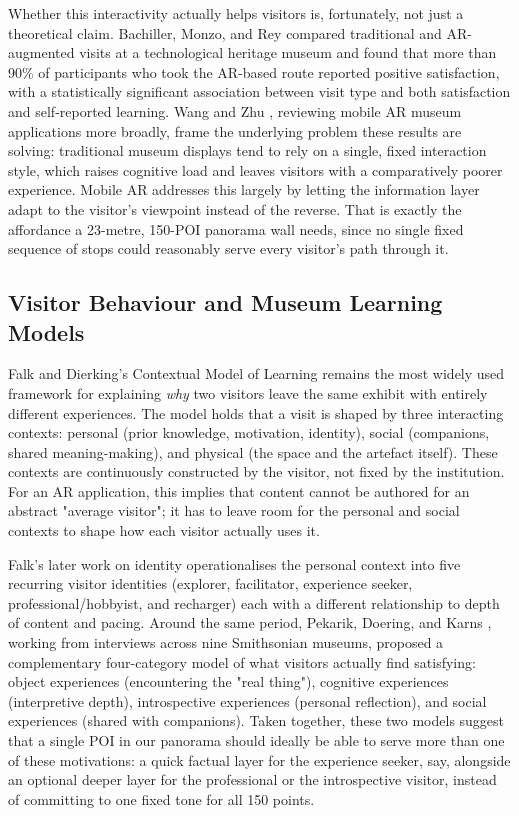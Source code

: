 Whether this interactivity actually helps visitors is, fortunately, not
just a theoretical claim. Bachiller, Monzo, and Rey \cite{bachiller2023}
compared traditional and AR-augmented visits at a technological heritage
museum and found that more than 90\% of participants who took the
AR-based route reported positive satisfaction, with a statistically
significant association between visit type and both satisfaction and
self-reported learning. Wang and Zhu \cite{wangzhu2022}, reviewing mobile
AR museum applications more broadly, frame the underlying problem these
results are solving: traditional museum displays tend to rely on a single,
fixed interaction style, which raises cognitive load and leaves visitors
with a comparatively poorer experience. Mobile AR addresses this largely
by letting the information layer adapt to the visitor's viewpoint instead
of the reverse. That is exactly the affordance a 23-metre,
150-POI panorama wall needs, since no single fixed sequence of stops could
reasonably serve every visitor's path through it.

\subsection{Visitor Behaviour and Museum Learning Models}
\label{subsec:rw-visitor-models}

Falk and Dierking's Contextual Model of Learning \cite{falkdierking2000}
remains the most widely used framework for explaining \emph{why} two
visitors leave the same exhibit with entirely different experiences. The
model holds that a visit is shaped by three interacting contexts: personal (prior knowledge, motivation, identity), social (companions, shared meaning-making), and physical (the space and the artefact itself). These contexts are continuously constructed by the visitor,
not fixed by the institution. For an AR application, this
implies that content cannot be authored for an abstract "average visitor";
it has to leave room for the personal and social contexts to shape how
each visitor actually uses it.

Falk's later work on identity \cite{falk2009} operationalises the personal
context into five recurring visitor identities (explorer, facilitator, experience seeker, professional/hobbyist, and recharger) each with a
different relationship to depth of content and pacing. Around the same
period, Pekarik, Doering, and Karns \cite{pekarik1999}, working from
interviews across nine Smithsonian museums, proposed a complementary
four-category model of what visitors actually find satisfying: object
experiences (encountering the "real thing"), cognitive experiences
(interpretive depth), introspective experiences (personal reflection),
and social experiences (shared with companions). Taken together, these
two models suggest that a single POI in our panorama should ideally be
able to serve more than one of these motivations: a quick factual layer
for the experience seeker, say, alongside an optional deeper layer for
the professional or the introspective visitor, instead of committing to
one fixed tone for all 150 points.

